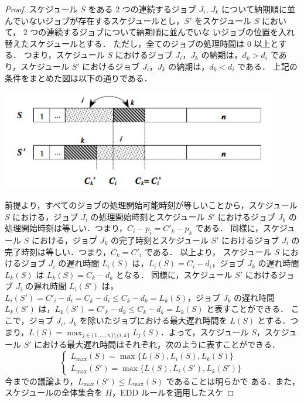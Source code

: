 \documentclass[12pt]{optlab-bachelor}
\begin{document}
\begin{proof}
  スケジュール $S$ をある 2 つの連続するジョブ $J_i$, $J_k$ について納期順に並んでいないジョブが存在するスケジュールとし，$S'$ をスケジュール $S$ において，
  2 つの連続するジョブについて納期順に並んでいな
  いジョブの位置を入れ替えたスケジュールとする．
  ただし，全てのジョブの処理時間は 0 以上とする．
  つまり，スケジュール $S$ におけるジョブ $J_i$，$J_k$ の納期は，$d_k > d_i$ であり，スケジュール $S'$ におけるジョブ $J_i$，$J_k$ の納期は，$d_k < d_i$ である．
  上記の条件をまとめた図は以下の通りである．
  \begin{center}
    \includegraphics[width = 12cm]{EDDrule.png}
  \end{center}
  前提より，すべてのジョブの処理開始可能時刻が等しいことから，スケジュール $S$ における，ジョブ $J_i$ の処理開始時刻とスケジュール $S'$ におけるジョブ $J_k$ の処理開始時刻は等しい．つまり，$C_i - p_i = C'_k - p_k$ である．
  同様に，スケジュール $S$ における，ジョブ $J_k$ の完了時刻とスケジュール $S'$ におけるジョブ $J_i$ の完了時刻は等しい．つまり，$C_k = C'_i$ である．
  以上より，
  スケジュール $S$ におけるジョブ $J_i$ の遅れ時間 $L_i(S)$ は，$L_i(S) = C_i - d_i$，ジョブ $J_k$ の遅れ時間 $L_k(S)$ は $L_k(S) = C_k - d_k$ となる．
  同様に，スケジュール $S'$ におけるジョブ $J_i$ の遅れ時間 $L_i(S')$ は，$L_i(S') = C'_i - d_i = C_k - d_i \le C_k -
  d_k = L_k(S)$，ジョブ $J_k$ の遅れ時間 $L_k(S')$ は，$L_k(S') = C'_k - d_k \le C_k - d_k = L_k(S)$ と表すことができる．
  ここで，ジョブ $J_i,\ J_k$ を除いたジョブにおける最大遅れ時間を $L(S)$
  とする．つまり，$L(S) = \displaystyle \max_{j \in \{1,\ldots,n\}
  \setminus \{i,k\}}L_j(S)$．よって，スケジュール $S$，スケジュール
  $S'$ における最大遅れ時間はそれぞれ，次のように表すことができる．
  $$\left\{ \begin{array}{lll} L_{\max}(S) =
  \max\{L(S),L_i(S),L_k(S)\} \\ L_{\max}(S') =
  \max\{L(S),L_i(S'),L_k(S')\}\end{array} \right.$$
  今までの議論より，$L_{\max}(S') \le L_{\max}(S)$ であることは明らかで
  ある．また，スケジュールの全体集合を $\Pi$，EDD ルールを適用したスケ

\end{proof}
\end{document}
